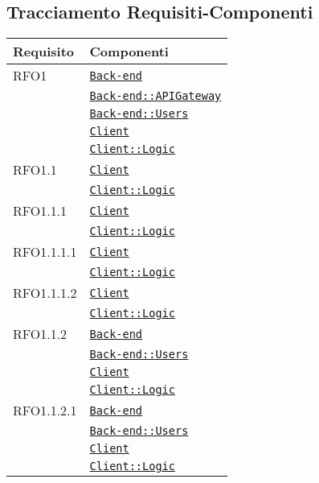 \subsection{Tracciamento Requisiti-Componenti}
\normalsize
\begin{longtable}{|>{\centering}m{3cm}|m{10cm}<{\centering}|}
\hline 
\textbf{Requisito} & \textbf{Componenti}\\
\hline
\endhead
RFO1 & \hyperref[Back-end]{\texttt{Back-end}}\\
& \hyperref[Back-end::APIGateway]{\texttt{Back-end::APIGateway}}\\
& \hyperref[Back-end::Users]{\texttt{Back-end::Users}}\\
& \hyperref[Client]{\texttt{Client}}\\
& \hyperref[Client::Logic]{\texttt{Client::Logic}}\\ \hline

RFO1.1 & \hyperref[Client]{\texttt{Client}}\\
& \hyperref[Client::Logic]{\texttt{Client::Logic}}\\ \hline

RFO1.1.1 & \hyperref[Client]{\texttt{Client}}\\
& \hyperref[Client::Logic]{\texttt{Client::Logic}}\\ \hline

RFO1.1.1.1 & \hyperref[Client]{\texttt{Client}}\\
& \hyperref[Client::Logic]{\texttt{Client::Logic}}\\ \hline

RFO1.1.1.2 & \hyperref[Client]{\texttt{Client}}\\
& \hyperref[Client::Logic]{\texttt{Client::Logic}}\\ \hline

RFO1.1.2 & \hyperref[Back-end]{\texttt{Back-end}}\\
& \hyperref[Back-end::Users]{\texttt{Back-end::Users}}\\
& \hyperref[Client]{\texttt{Client}}\\
& \hyperref[Client::Logic]{\texttt{Client::Logic}}\\ \hline

RFO1.1.2.1 & \hyperref[Back-end]{\texttt{Back-end}}\\
& \hyperref[Back-end::Users]{\texttt{Back-end::Users}}\\
& \hyperref[Client]{\texttt{Client}}\\
& \hyperref[Client::Logic]{\texttt{Client::Logic}}\\ \hline


\end{longtable}

